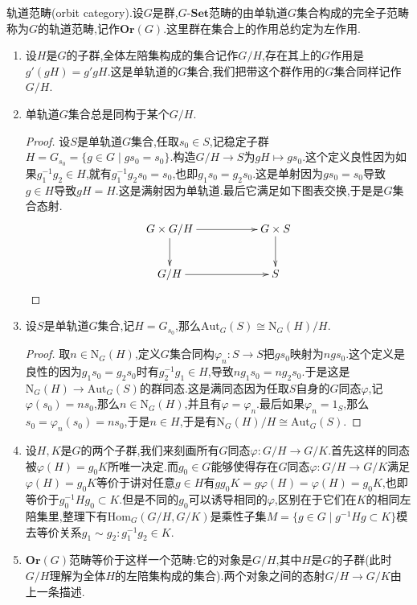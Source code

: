 轨道范畴(orbit category).设$G$是群,$G$-$\textbf{Set}$范畴的由单轨道$G$集合构成的完全子范畴称为$G$的轨道范畴,记作$\textbf{Or}(G)$.这里群在集合上的作用总约定为左作用.
\begin{enumerate}
	\item 设$H$是$G$的子群,全体左陪集构成的集合记作$G/H$,存在其上的$G$作用是$g'(gH)=g'gH$.这是单轨道的$G$集合,我们把带这个群作用的$G$集合同样记作$G/H$.
	\item 单轨道$G$集合总是同构于某个$G/H$.
	\begin{proof}
		
		设$S$是单轨道$G$集合,任取$s_0\in S$,记稳定子群$H=G_{s_0}=\{g\in G\mid gs_0=s_0\}$.构造$G/H\to S$为$gH\mapsto gs_0$.这个定义良性因为如果$g_1^{-1}g_2\in H$,就有$g_1^{-1}g_2s_0=s_0$,也即$g_1s_0=g_2s_0$.这是单射因为$gs_0=s_0$导致$g\in H$导致$gH=H$.这是满射因为单轨道.最后它满足如下图表交换,于是是$G$集合态射.
		$$\xymatrix{G\times G/H\ar[rr]\ar[d]&&G\times S\ar[d]\\G/H\ar[rr]&&S}$$
	\end{proof}
	\item 设$S$是单轨道$G$集合,记$H=G_{s_0}$,那么$\mathrm{Aut}_G(S)\cong\mathrm{N}_G(H)/H$.
	\begin{proof}
		
		取$n\in\mathrm{N}_G(H)$,定义$G$集合同构$\varphi_n:S\to S$把$gs_0$映射为$ngs_0$.这个定义是良性的因为$g_1s_0=g_2s_0$时有$g_2^{-1}g_1\in H$,导致$ng_1s_0=ng_2s_0$.于是这是$\mathrm{N}_G(H)\to\mathrm{Aut}_G(S)$的群同态.这是满同态因为任取$S$自身的$G$同态$\varphi$,记$\varphi(s_0)=ns_0$,那么$n\in\mathrm{N}_G(H)$,并且有$\varphi=\varphi_n$.最后如果$\varphi_n=1_S$,那么$s_0=\varphi_n(s_0)=ns_0$,于是$n\in H$,于是有$\mathrm{N}_G(H)/H\cong\mathrm{Aut}_G(S)$.
	\end{proof}
	\item 设$H,K$是$G$的两个子群,我们来刻画所有$G$同态$\varphi:G/H\to G/K$.首先这样的同态被$\varphi(H)=g_0K$所唯一决定.而$g_0\in G$能够使得存在$G$同态$\varphi:G/H\to G/K$满足$\varphi(H)=g_0K$等价于讲对任意$g\in H$有$gg_0K=g\varphi(H)=\varphi(H)=g_0K$,也即等价于$g_0^{-1}Hg_0\subset K$.但是不同的$g_0$可以诱导相同的$\varphi$,区别在于它们在$K$的相同左陪集里,整理下有$\mathrm{Hom}_G(G/H,G/K)$是乘性子集$M=\{g\in G\mid g^{-1}Hg\subset K\}$模去等价关系$g_1\sim g_2:g_1^{-1}g_2\in K$.
	\item $\textbf{Or}(G)$范畴等价于这样一个范畴:它的对象是$G/H$,其中$H$是$G$的子群(此时$G/H$理解为全体$H$的左陪集构成的集合).两个对象之间的态射$G/H\to G/K$由上一条描述.
\end{enumerate}

